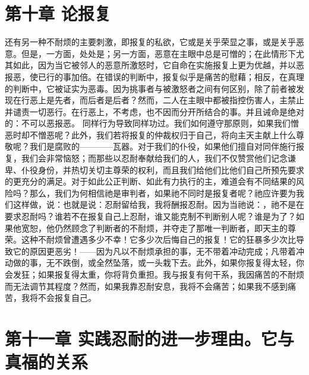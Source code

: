 
\section{第十章 论报复}

还有另一种不耐烦的主要刺激，即报复的私欲，它或是关乎荣显之事，或是关乎恶意。但是，一方面，处处是；另一方面，恶意在主眼中总是可憎的；在此情形下尤其如此，因为当它被邻人的恶意所激怒时，它自命在实施报复上更为优越，并以恶报恶，使已行的事加倍。在错误的判断中，报复似乎是痛苦的慰藉；相反，在真理的判断中，它被证实为恶毒。因为挑事者与被激怒者之间有何区别，除了前者被发现在行恶上是先者，而后者是后者？然而，二人在主眼中都被指控伤害人，主禁止并谴责一切恶行。在行恶上，不考虑，也不因而分开所结合的事。并且诫命是绝对的：不可以恶报恶。 同样行为导致同样功过。我们如何遵守那原则，如果我们憎恶时却不憎恶呢？此外，我们若将报复的仲裁权归于自己，将向主天主献上什么尊敬呢？我们是腐败的————瓦器。对于我们的仆役，如果他们擅自对同伴施行报复，我们会非常恼怒；而那些以忍耐奉献给我们的人，我们不仅赞赏他们记念谦卑、仆役身份，并热切关切主尊荣的权利，而且我们给他们比他们自己所预先要求的更充分的满足。对于如此公正判断、如此有力执行的主，难道会有不同结果的风险吗？那么，我们为何相信祂是审判者，如果祂不同时是报复者呢？祂应许要为我们这样做，说：也就是说：忍耐留给我，我将酬报忍耐。因为当祂说：，祂不是在要求忍耐吗？谁若不在报复自己上忍耐，谁又能克制不判断别人呢？谁是为了？如果他宽恕，他仍然顾念了判断者的不耐烦，并夺走了那唯一判断者，即天主的尊荣。这种不耐烦曾遭遇多少不幸！它多少次后悔自己的报复！它的狂暴多少次比导致它的原因更恶劣！——因为凡以不耐烦承担的事，无不带着冲动完成；凡带着冲动做的事，无不跌倒，或全然坠落，或一头栽下去。此外，如果你报复得太轻，你会发狂；如果报复得太重，你将背负重担。我与报复有何干系，我因痛苦的不耐烦而无法调节其程度？然而，如果我靠忍耐安息，我将不会痛苦；如果我不感到痛苦，我将不会报复自己。\par


\section{第十一章 实践忍耐的进一步理由。它与真福的关系}

